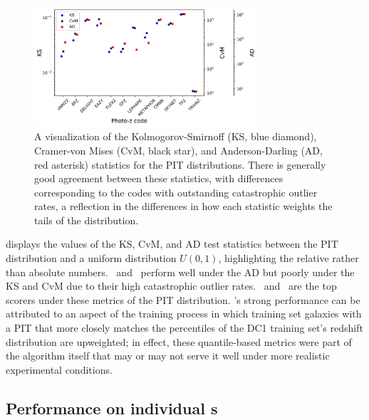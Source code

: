 \begin{figure}
	\centering
	\includegraphics[width=0.74\textwidth]{figures/pzdc1/KSvsCvMvsAD_PIT_withnull_jpg.jpg}
	\caption{A visualization of the Kolmogorov-Smirnoff (KS, blue diamond), Cramer-von Mises (CvM, black star), and Anderson-Darling (AD, red asterisk) statistics for the PIT distributions.
		There is generally good agreement between these statistics, with differences corresponding to the codes with outstanding catastrophic outlier rates, a reflection in the differences in how each statistic weights the tails of the distribution.}
\end{figure}

 displays the values of the KS, CvM, and AD test statistics between the PIT distribution and a uniform distribution $U(0, 1)$, highlighting the relative rather than absolute numbers.
\metaphor\ and \lephare\ perform well under the AD but poorly under the KS and CvM due to their high catastrophic outlier rates.
\annz\ and \flexzboost\  are the top scorers under these metrics of the PIT distribution.
\annz's strong performance can be attributed to an aspect of the training process in which training set galaxies with a PIT that more closely matches the percentiles of the DC1 training set's redshift distribution are upweighted; in effect, these quantile-based metrics were part of the algorithm itself that may or may not serve it well under more realistic experimental conditions.

\subsection{Performance on individual \pzpdf s}

